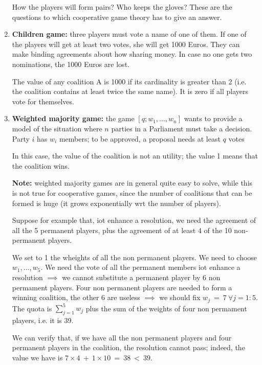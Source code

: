 \begin{enumerate}
	\noindent How the players will form pairs? Who keeps the gloves? These are the 
	questions to which cooperative game theory has to give an answer.

	\item \textbf{Children game:} three players must vote a name of one of them. If one of the players will get at least two votes, she will get 1000 Euros. They can make binding agreements about how sharing money. In case no one gets two nominations, the 1000 Euros are lost.

	\noindent The value of any coalition A is 1000 if its cardinality is greater 
	than 2 (i.e. the coalition contains at least twice the same name). It is zero 
	if all players vote for themselves.

	\item \textbf{Weighted majority game:} the game $[q; w_1,...,w_n]$ wants to provide a model of the situation where $n$ parties in a Parliament must take a decision. Party $i$ has $w_i$ members; to be approved, a proposal needs at least $q$ votes

	\noindent In this case, the value of the coalition is not an utility; the 
	value 1 means that the coalition wins.
	
	\noindent \textbf{Note:} weighted majority games are in general quite easy to 
	solve, while this is not true for cooperative games, since the number of 
	coalitions that can be formed is huge (it grows exponentially wrt the number 
	of players).
	
	\noindent Suppose for example that, iot enhance a resolution, we need the agreement of all the 5 permanent players, plus the agreement of at least 4 of the 10 non-permanent players.
	
	\noindent We set to 1 the wheights of all the non permanent players. We need 
	to choose $w_1,...,w_5$. We need the vote of all the permanent members iot 
	enhance a resolution $\implies$ we cannot substitute a permanent player by 6 non 
	permament players. Four non permanent players are needed to form a 
	winning coalition, the other 6 are useless $\implies$ we should fix $w_j~=~7~
	\forall j=1:5$. The quota is $\sum_{j=1}^5{w_j}$ plus the sum of the 
	weights of four non permament players, i.e. it is 39.
	
	\noindent We can verify that, if we have all the non permanent players and four 
	permanent players in the coalition, the resolution cannot pass; indeed, the 
	value we have is $7 \times 4 ~+~ 1 \times 10 ~=~ 38 ~<~ 39$.
	

\end{enumerate}
